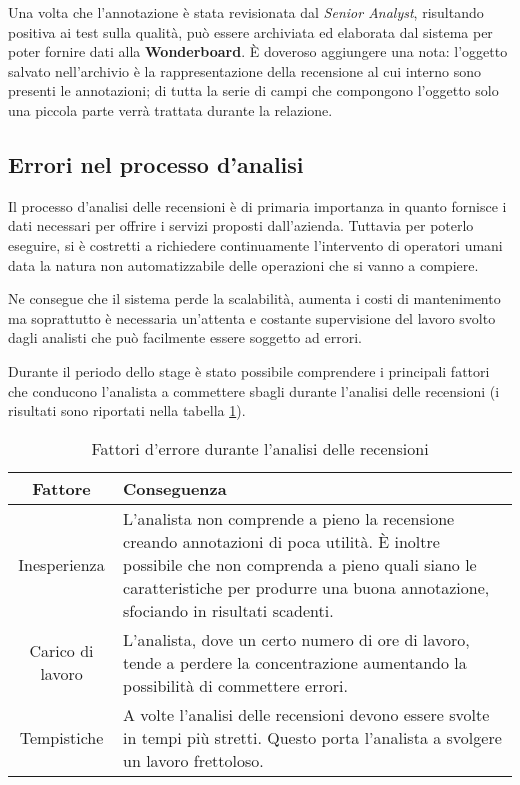 Una volta che l'annotazione è stata revisionata dal \textit{Senior Analyst},
risultando positiva ai test sulla qualità, può essere archiviata ed elaborata
dal sistema per poter fornire dati alla \textbf{Wonderboard}. È doveroso
aggiungere una nota: l'oggetto salvato nell'archivio è la rappresentazione
della recensione al cui interno sono presenti le annotazioni; di tutta la serie
di campi che compongono l'oggetto solo una piccola parte verrà trattata durante
la relazione.

\subsection{Errori nel processo d'analisi}
Il processo d'analisi delle recensioni è di primaria importanza in quanto
fornisce i dati necessari per offrire i servizi proposti dall'azienda.
Tuttavia per poterlo eseguire, si è costretti a richiedere continuamente
l'intervento di operatori umani data la natura non automatizzabile delle
operazioni che si vanno a compiere.

Ne consegue che il sistema perde la scalabilità, aumenta i costi di mantenimento
ma soprattutto è necessaria un'attenta e costante supervisione del lavoro svolto
dagli analisti che può facilmente essere soggetto ad errori.

Durante il periodo dello stage è stato possibile comprendere i principali
fattori che conducono l'analista a commettere sbagli durante l'analisi delle
recensioni (i risultati sono riportati nella tabella \ref{tab:fattori_errore}).

\begin{table}[ht]
\begin{center}
\begin{tabular}{|c|p{10cm}|}
\hline
\textbf{Fattore} & \textbf{Conseguenza} \\ \hline
Inesperienza &
L'analista non comprende a pieno la recensione creando annotazioni di poca
utilità. È inoltre possibile che non comprenda a pieno quali siano le
caratteristiche per produrre una buona annotazione, sfociando in risultati
scadenti. \\ \hline
Carico di lavoro &
L'analista, dove un certo numero di ore di lavoro, tende a perdere la
concentrazione aumentando la possibilità di commettere errori. \\ \hline
Tempistiche &
A volte l'analisi delle recensioni devono essere svolte in tempi più stretti.
Questo porta l'analista a svolgere un lavoro frettoloso.
\\ \hline
\end{tabular}
\end{center}
\caption{Fattori d'errore durante l'analisi delle recensioni}
\label{tab:fattori_errore}
\end{table}

